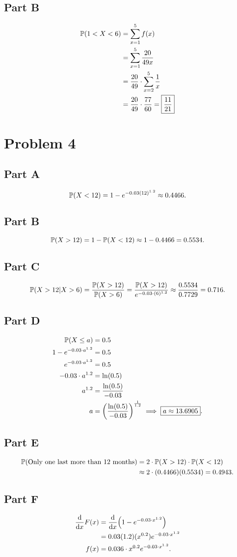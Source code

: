 \documentclass[12pt]{extarticle}
\begin{document}
\subsection*{Part B}
\begin{align*}
	\mathbb{P}\qty(1 < X < 6) &= \sum_{x=1}^{5} f(x) \\
	&= \sum_{x=1}^{5} \frac{20}{49x} \\
	&= \frac{20}{49}\cdot\sum_{x=2}^{5} \frac{1}{x} \\
	&= \frac{20}{49}\cdot\frac{77}{60} = \boxed{\frac{11}{21}}
\end{align*}

\section*{Problem 4}
\subsection*{Part A}
\[
	\mathbb{P}\qty(X < 12) = 1 - e^{-0.03 (12)^{1.2}} \approx 0.4466
.\]

\subsection*{Part B}
\[
	\mathbb{P}\qty(X > 12) = 1 - \mathbb{P}\qty(X < 12) \approx 1 - 0.4466 = 0.5534
.\]

\subsection*{Part C}
\[
	\mathbb{P}\qty(X > 12 | X > 6) = \frac{\mathbb{P}\qty(X > 12)}{\mathbb{P}\qty(X > 6)} = \frac{\mathbb{P}\qty(X > 12)}{e^{-0.03\cdot(6)^{1.2}}} \approx \frac{0.5534}{0.7729} = 0.716
.\]

\subsection*{Part D}
\begin{align*}
	\mathbb{P}\qty(X \leq a) &= 0.5 \\
	1 - e^{-0.03 \cdot a^{1.2}} &= 0.5 \\
	e^{-0.03 \cdot a^{1.2}} &= 0.5 \\
	-0.03 \cdot a^{1.2} &= \ln(0.5) \\
	a^{1.2} &= \frac{\ln(0.5)}{-0.03} \\
	a &= \qty(\frac{\ln(0.5)}{-0.03})^{\frac{1}{1.2}} \implies \boxed{a \approx 13.6905}
.\end{align*}

\subsection*{Part E}
\begin{align*}
	\mathbb{P}\qty(\text{Only one last more than 12 months}) &= 2\cdot\mathbb{P}\qty(X > 12)\cdot\mathbb{P}\qty(X < 12) \\
	&\approx 2\cdot(0.4466)(0.5534) = 0.4943
.\end{align*}

\subsection*{Part F}
\begin{align*}
	\dv{x} F(x) &= \dv{x}\qty(1 - e^{-0.03\cdot x^{1.2}}) \\
							&= 0.03(1.2)(x^{0.2}) e^{-0.03\cdot x^{1.2}} \\
				 f(x) &= 0.036\cdot x^{0.2} e^{-0.03\cdot x^{1.2}}
.\end{align*}
\end{document}
